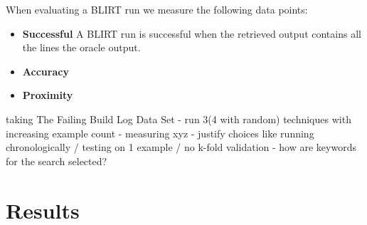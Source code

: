 \documentclass[\myrootdir/main.tex]{subfiles}
\begin{document}
When evaluating a BLIRT run we measure the following data points:
\begin{itemize}
	\item \textbf{Successful} A BLIRT run is successful when the retrieved output contains all the lines the oracle output.
	\item \textbf{Accuracy} 
	\item \textbf{Proximity} 
\end{itemize}

taking The Failing Build Log Data Set - run 3(4 with random) techniques with increasing example count - measuring xyz - justify choices like running chronologically / testing on 1 example / no k-fold validation - how are keywords for the search selected?

\section{Results}
\end{document}
